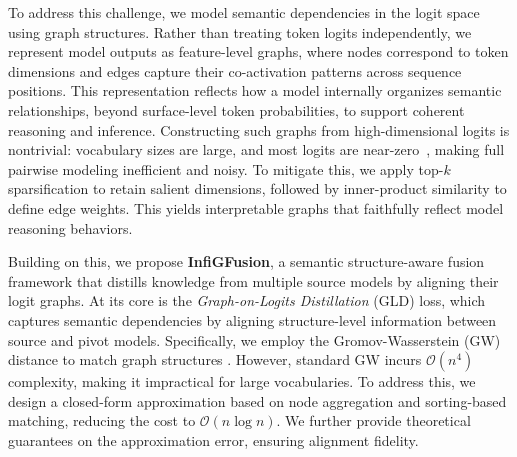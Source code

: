 \documentclass{article}
\begin{document}
To address this challenge, we model semantic dependencies in the logit space using graph structures. Rather than treating token logits independently, we represent model outputs as feature-level graphs, where nodes correspond to token dimensions and edges capture their co-activation patterns across sequence positions. This representation reflects how a model internally organizes semantic relationships, beyond surface-level token probabilities, to support coherent reasoning and inference. Constructing such graphs from high-dimensional logits is nontrivial: vocabulary sizes are large, and most logits are near-zero~\cite{zhuang2024setwise, lu2024discovering}, making full pairwise modeling inefficient and noisy. To mitigate this, we apply top-$k$ sparsification to retain salient dimensions, followed by inner-product similarity to define edge weights. This yields interpretable graphs that faithfully reflect model reasoning behaviors.




Building on this, we propose \textbf{InfiGFusion}, a semantic structure-aware fusion framework that distills knowledge from multiple source models by aligning their logit graphs. At its core is the \textit{Graph-on-Logits Distillation} (GLD) loss, which captures semantic dependencies by aligning structure-level information between source and pivot models. Specifically, we employ the Gromov-Wasserstein (GW) distance to match graph structures \cite{xu2019scalable, peyre2016gromov}. However, standard GW incurs $\mathcal{O}(n^4)$ complexity, making it impractical for large vocabularies. To address this, we design a closed-form approximation based on node aggregation and sorting-based matching, reducing the cost to $\mathcal{O}(n \log n)$. We further provide theoretical guarantees on the approximation error, ensuring alignment fidelity.
\end{document}
